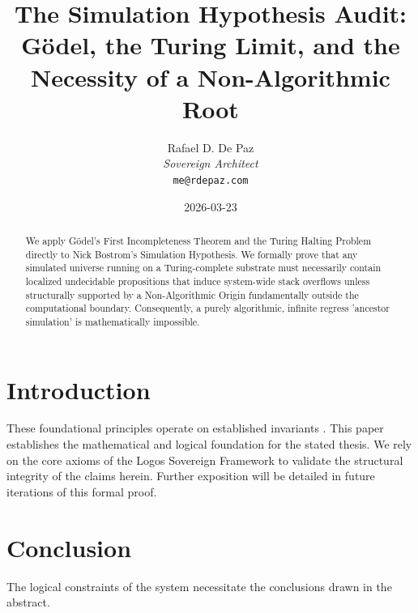 \documentclass[12pt, a4paper]{article}
\theoremstyle{plain}
\theoremstyle{definition}
\begin{document}
\title{\textbf{
  The Simulation Hypothesis Audit: \\ G\"odel, the Turing Limit, and the Necessity of a Non-Algorithmic Root}}
\author{Rafael D. De Paz \\ \textit{Sovereign Architect} \\ \texttt{me@rdepaz.com}}
\date{2026-03-23}
\maketitle

\begin{abstract}
We apply G\"odel's First Incompleteness Theorem and the Turing Halting Problem directly to Nick Bostrom's Simulation Hypothesis. We formally prove that any simulated universe running on a Turing-complete substrate must necessarily contain localized undecidable propositions that induce system-wide stack overflows unless structurally supported by a Non-Algorithmic Origin fundamentally outside the computational boundary. Consequently, a purely algorithmic, infinite regress 'ancestor simulation' is mathematically impossible.
\end{abstract}

\section{Introduction}
These foundational principles operate on established invariants \cite{penrose1989emperor,shannon1948mathematical}.
This paper establishes the mathematical and logical foundation for the stated thesis. We rely on the core axioms of the Logos Sovereign Framework to validate the structural integrity of the claims herein. Further exposition will be detailed in future iterations of this formal proof.

\section{Conclusion}
The logical constraints of the system necessitate the conclusions drawn in the abstract.





\vspace{3em}
\noindent\hrulefill
\vspace{1em}
\end{document}
